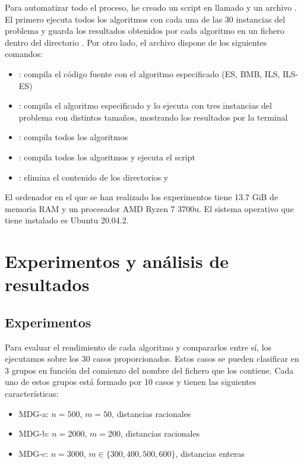 \documentclass[10pt,a4paper]{article}
\begin{document}
Para automatizar todo el proceso, he creado un script en  llamado  y un archivo . El primero ejecuta todos los algoritmos con cada una de las 30 instancias del problema y guarda los resultados obtenidos por cada algoritmo en un fichero  dentro del directorio . Por otro lado, el archivo  dispone de los siguientes comandos:

\begin{itemize}
	\item {}: compila el código fuente con el algoritmo especificado (ES, BMB, ILS, ILS-ES)
	\item {}: compila el algoritmo especificado y lo ejecuta con tres instancias del problema con distintos tamaños, mostrando los resultados por la terminal
	\item {}: compila todos los algoritmos
	\item {}: compila todos los algoritmos y ejecuta el script 
	\item {}: elimina el contenido de los directorios  y 
\end{itemize}

El ordenador en el que se han realizado los experimentos tiene 13.7 GiB de memoria RAM y un procesador AMD Ryzen 7 3700u. El sistema operativo que tiene instalado es Ubuntu 20.04.2.






\section{Experimentos y análisis de resultados}

\subsection{Experimentos}

Para evaluar el rendimiento de cada algoritmo y compararlos entre sí, los ejecutamos sobre los 30 casos proporcionados. Estos casos se pueden clasificar en 3 grupos en función del comienzo del nombre del fichero que los contiene. Cada uno de estos grupos está formado por 10 casos y tienen las siguientes características:

\begin{itemize}
	\item MDG-a: $n = 500$, $m = 50$, distancias racionales
	\item MDG-b: $n = 2000$, $m = 200$, distancias racionales
	\item MDG-c: $n = 3000$, $m \in \{300,400,500,600\}$, distancias enteras
\end{itemize}
\end{document}
